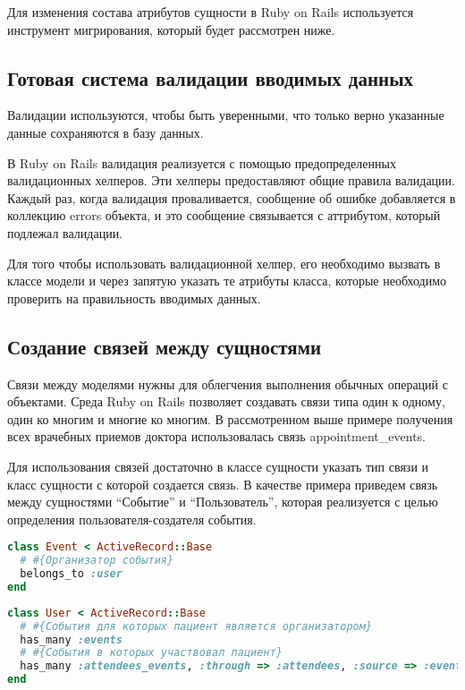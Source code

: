 Для изменения состава атрибутов сущности в Ruby on Rails используется инструмент
мигрирования, который будет рассмотрен ниже.

\subsection{Готовая система валидации вводимых данных}
Валидации используются, чтобы быть уверенными, что только верно указанные данные
сохраняются в базу данных.

В Ruby on Rails валидация реализуется с помощью предопределенных валидационных
хелперов. Эти хелперы предоставляют общие правила валидации. Каждый раз, когда
валидация проваливается, сообщение об ошибке добавляется в коллекцию errors
объекта, и это сообщение связывается с аттрибутом, который подлежал валидации.

Для того чтобы использовать валидационной хелпер, его необходимо вызвать в
классе модели и через запятую указать те атрибуты класса, которые необходимо
проверить на правильность вводимых данных.

\subsection{Создание связей между сущностями}
Связи между моделями нужны для облегчения выполнения обычных операций с
объектами. Среда Ruby on Rails позволяет создавать связи типа один к одному,
один ко многим и многие ко многим. В рассмотренном выше примере получения всех
врачебных приемов доктора использовалась связь appointment\_events.

Для использования связей достаточно в классе сущности указать тип связи и класс
сущности с которой создается связь. В качестве примера приведем связь между
сущностями “Событие” и “Пользователь”, которая реализуется с целью определения
пользователя-создателя события.

\begin{lstlisting}[language=Ruby,caption=Связь на
стороне события,label={lst:ar_event_links}] 
class Event < ActiveRecord::Base
  # #{Организатор события} 
  belongs_to :user
end  
\end{lstlisting}

\begin{lstlisting}[language=Ruby,caption=Связь на
стороне события,label={lst:ar_user_links}]
class User < ActiveRecord::Base  
  # #{События для которых пациент является организатором}
  has_many :events
  # #{События в которых участвовал пациент}
  has_many :attendees_events, :through => :attendees, :source => :event
end  
\end{lstlisting}

